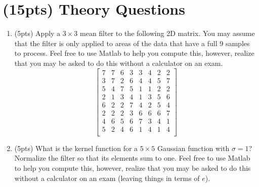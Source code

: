 \documentclass[12pt]{article}
\begin{document}
\section{(15pts) Theory Questions}
\begin{enumerate}
\item (5pts) Apply a $3\times3$ mean filter to the following 2D matrix.  You may assume that the filter is only applied to areas of the data that have a full 9 samples to process.  Feel free to use Matlab to help you compute this, however, realize that you may be asked to do this without a calculator on an exam.
$$
\begin{bmatrix}
7&   7&     6&     3&     3&     4&     2&     2\\
3&   7&     2&     6&     4&     4&     5&     7\\
5&   4&     7&     5&     1&     1&     2&     2\\
2&   1&     3&     4&     1&     3&     5&     6\\
6&   2&     2&     7&     4&     2&     5&     4\\
2&   2&     2&     3&     6&     6&     6&     7\\
4&   6&     5&     6&     7&     3&     4&     1\\
5&   2&     4&     6&     1&     4&     1&     4\\
\end{bmatrix}
$$

\item (5pts) What is the kernel function for a $5\times5$ Gaussian function with $\sigma=1$?   Normalize the filter so that its elements sum to one.  Feel free to use Matlab to help you compute this, however, realize that you may be asked to do this without a calculator on an exam (leaving things in terms of $e$).



\end{enumerate}
\end{document}
